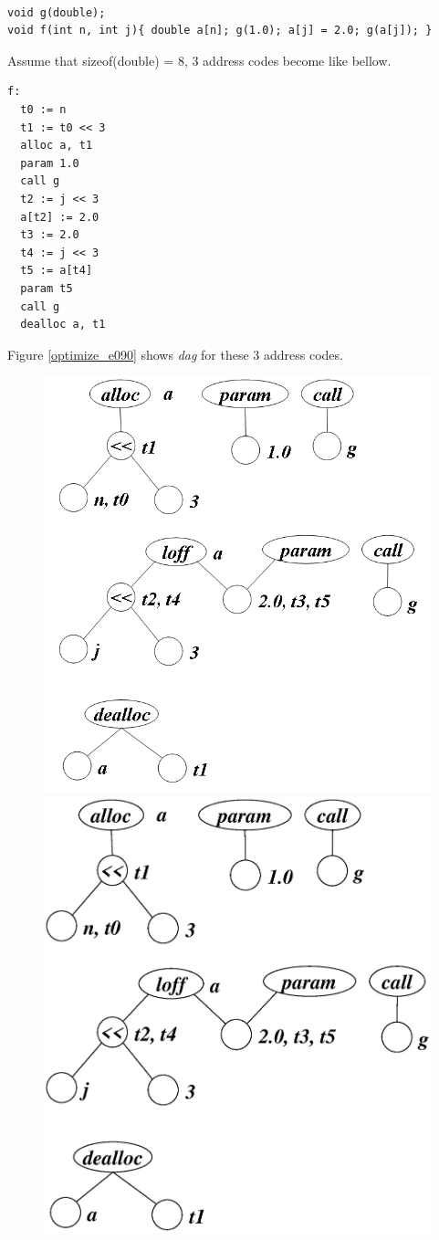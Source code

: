 \begin{Example}
\label{optimize_e089}
\begin{verbatim}

void g(double);
void f(int n, int j){ double a[n]; g(1.0); a[j] = 2.0; g(a[j]); }
\end{verbatim}
Assume that 
sizeof(double) = 8, 3 address codes become like bellow.
\begin{verbatim}
f:
  t0 := n
  t1 := t0 << 3
  alloc a, t1
  param 1.0
  call g
  t2 := j << 3
  a[t2] := 2.0
  t3 := 2.0
  t4 := j << 3
  t5 := a[t4]
  param t5
  call g
  dealloc a, t1
\end{verbatim}
Figure \ref{optimize_e090} shows {\em dag} for these 3 address codes.
\begin{figure}[htbp]
\begin{center}
\begin{htmlonly}
\includegraphics[width=0.392\linewidth,height=0.5\linewidth]{opt038.png}
\end{htmlonly}
\begin{latexonly}
\includegraphics[width=0.928\linewidth,height=1.0\linewidth]{opt038.eps}

\end{latexonly}
\end{center}
\end{figure}
\end{Example}
